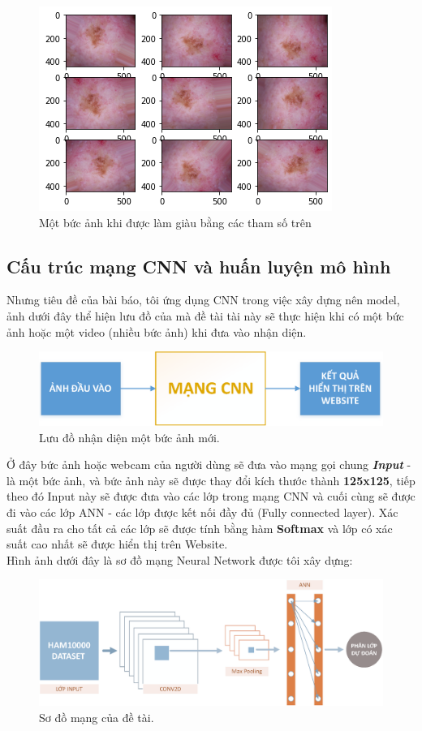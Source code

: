 \documentclass[12pt,a4paper]{article}
\begin{document}
	\begin{figure}[h!]
		\centering
		\includegraphics[width=0.5\linewidth]{./images/AnhLamGiau.png}
		\caption{Một bức ảnh khi được làm giàu bằng các tham số trên}
		\label{fig:AnhLamGiau}
	\end{figure}
	
	\subsection{Cấu trúc mạng CNN và huấn luyện mô hình}
	
	Nhưng tiêu đề của bài báo, tôi ứng dụng CNN trong việc xây dựng nên model, ảnh dưới đây thể hiện lưu đồ của mà đề tài tài này sẽ thực hiện khi có một bức ảnh hoặc một video (nhiều bức ảnh) khi đưa vào nhận diện.
	
	\begin{figure}[h!]
		\centering
		\includegraphics[width=0.8\linewidth]{./images/soDo_1.eps}
		\caption{Lưu đồ nhận diện một bức ảnh mới.}
		\label{fig:soDo1}
	\end{figure}

	\noindent
	Ở đây bức ảnh hoặc webcam của người dùng sẽ đưa vào mạng gọi chung \textit{\textbf{Input}} - là một bức ảnh, và bức ảnh này sẽ được thay đổi kích thước thành \textbf{125x125}, tiếp theo đó Input này sẽ được đưa vào các lớp trong mạng CNN và cuối cùng sẽ được đi vào các lớp ANN - các lớp được kết nối đầy đủ (Fully connected layer). Xác suất đầu ra cho tất cả các lớp sẽ được tính bằng hàm \textbf{Softmax} và lớp có xác suất cao nhất sẽ được hiển thị trên Website.\\
	
	\noindent
	Hình ảnh dưới đây là sơ đồ mạng Neural Network được tôi xây dựng:
	\begin{figure}[h!]
		\centering
		\includegraphics[width=\linewidth]{./images/SoDoCNN.eps}
		\caption{Sơ đồ mạng của đề tài.}
		\label{fig:soDoMang}
	\end{figure}
	
\end{document}
